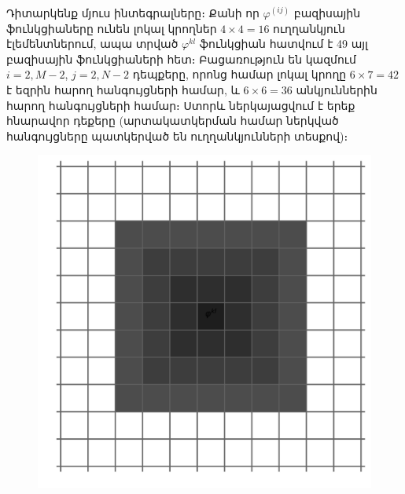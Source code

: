 \documentclass[fleqn, bachelor,subf,12pt,notitlepage]{article}
\begin{document}
Դիտարկենք մյուս ինտեգրալները։ Քանի որ $\varphi^{(ij)}$ բազիսային ֆունկցիաները ունեն լոկալ կրողներ $4 \times 4 = 16$ ուղղանկյուն էլեմենտներում, ապա տրված $\varphi^{kl}$ ֆունկցիան հատվում է 49 այլ բազիսային ֆունկցիաների հետ։ Բացառություն են կազմում $i=2, M-2$, $j=2, N-2$ դեպքերը, որոնց համար լոկալ կրողը $6 \times 7 = 42$ է եզրին հարող հանգույցների համար, և $6 \times 6 = 36$ անկյուններին հարող հանգույցների համար։ Ստորև ներկայացվում է երեք հնարավոր դեքերը (արտակատկերման համար ներկված հանգույցները պատկերված են ուղղանկյունների տեսքով)։
\begin{figure}[H]
  \centering
  \begin{minipage}[b]{0.2\textwidth}
    \includegraphics[width=\textwidth]{images/two_dimensional_basis_intersection}
  \end{minipage}
  \hfill
  \begin{minipage}[b]{0.2\textwidth}

\end{minipage}
\end{figure}
\end{document}
